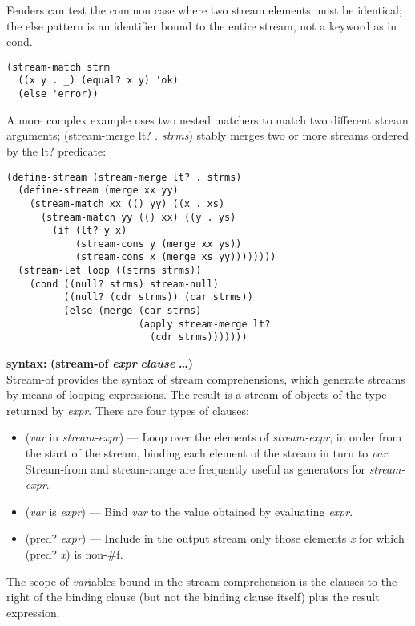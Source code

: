 Fenders can test the common case where two stream elements must be
identical; the else pattern is an identifier bound to the entire stream,
not a keyword as in cond.

\begin{verbatim}
(stream-match strm
  ((x y . _) (equal? x y) 'ok)
  (else 'error))
\end{verbatim}

A more complex example uses two nested matchers to match two different
stream arguments; (stream-merge lt? . \emph{strms}) stably merges two or
more streams ordered by the lt? predicate:

\begin{verbatim}
(define-stream (stream-merge lt? . strms)
  (define-stream (merge xx yy)
    (stream-match xx (() yy) ((x . xs)
      (stream-match yy (() xx) ((y . ys)
        (if (lt? y x)
            (stream-cons y (merge xx ys))
            (stream-cons x (merge xs yy))))))))
  (stream-let loop ((strms strms))
    (cond ((null? strms) stream-null)
          ((null? (cdr strms)) (car strms))
          (else (merge (car strms)
                       (apply stream-merge lt?
                         (cdr strms)))))))
\end{verbatim}

\textbf{syntax:} \textbf{(stream-of} \textbf{\emph{expr}} \textbf{}
\textbf{\emph{clause}} \textbf{\ldots{})}\\
Stream-of provides the syntax of stream comprehensions, which generate
streams by means of looping expressions. The result is a stream of
objects of the type returned by \emph{expr}. There are four types of
clauses:

\begin{itemize}
\tightlist
\item
  (\emph{var} in \emph{stream-expr}) --- Loop over the elements of
  \emph{stream-expr}, in order from the start of the stream, binding
  each element of the stream in turn to \emph{var}. Stream-from and
  stream-range are frequently useful as generators for
  \emph{stream-expr}.
\item
  (\emph{var} is \emph{expr}) --- Bind \emph{var} to the value obtained
  by evaluating \emph{expr}.
\item
  (pred? \emph{expr}) --- Include in the output stream only those
  elements \emph{x} for which (pred? \emph{x}) is non-\#f.
\end{itemize}

The scope of \emph{var}iables bound in the stream comprehension is the
clauses to the right of the binding clause (but not the binding clause
itself) plus the result expression.

